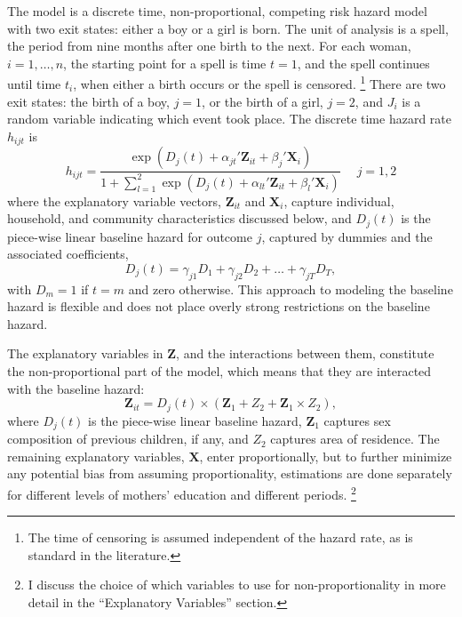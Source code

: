\documentclass[12pt,letterpaper]{article}
\begin{document}
The model is a discrete time, non-proportional, competing risk hazard model with two exit 
states: either a boy or a girl is born.
The unit of analysis is a spell, the period from nine months after one birth to the next.
For each woman, $i=1,\ldots,n$, the starting point for a spell is time $t=1$, and 
the spell continues until time $t_i$, when either a birth occurs or the spell 
is censored.%
\footnote{
The time of censoring is assumed independent of the hazard rate,
as is standard in the literature.
}
There are two exit states: the birth of a boy, $j=1$, or the birth of a girl, $j=2$, and 
$J_i$ is a random variable indicating which event took place.
The discrete time hazard rate $h_{ijt}$ is 
\begin{equation}
 h_{ijt} = \frac{\exp(D_j(t) + \alpha_{jt}'\mathbf{Z}_{it} + \beta_j'\mathbf{X}_{i})} 
 {1 + \sum_{l=1}^2 \exp(D_j(t) + \alpha_{lt}'\mathbf{Z}_{it} + \beta_l'\mathbf{X}_{i})} \: \: \; \; \;  j = 1,2
 \label{eq:hazard}
\end{equation}
where the explanatory variable vectors, $\mathbf{Z}_{it}$ and $\mathbf{X}_{i}$, capture 
individual, household, and community characteristics discussed below,
and $D_{j}(t)$ is the piece-wise linear baseline hazard for outcome $j$, captured
by dummies and the associated coefficients,
\begin{equation}
D_j(t) = \gamma_{j1} D_1 + \gamma_{j2} D_2 + \ldots + \gamma_{jT} D_T,
\end{equation}
with $D_m = 1$ if $t=m$ and zero otherwise.
This approach to modeling the baseline hazard is flexible and does not place 
overly strong restrictions on the baseline hazard.

The explanatory variables in $\mathbf{Z}$, and the interactions between them, 
constitute the non-proportional part of the model, which means that they are
interacted with the baseline hazard:
\begin{equation}
 \mathbf{Z}_{it} = D_j(t) \times (\mathbf{Z}_1 + Z_2 + \mathbf{Z}_1 \times Z_2),
\end{equation}
where $D_j(t)$ is the piece-wise linear baseline hazard, $\mathbf{Z}_1$ captures sex 
composition of previous children, if any, and $Z_2$ captures area of residence.
The remaining explanatory variables, $\mathbf{X}$, enter proportionally,
but to further minimize any potential bias from assuming proportionality, estimations 
are done separately for different levels of mothers' education and different 
periods.%
\footnote{
I discuss the choice of which variables to use for non-proportionality in more detail
in the ``Explanatory Variables'' section.
}
\end{document}
